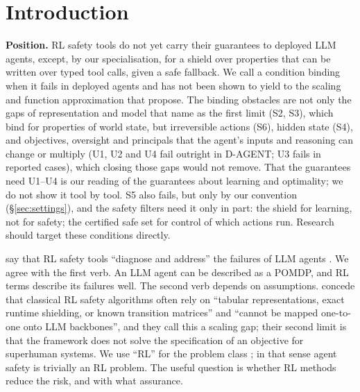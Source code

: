 \documentclass{article}
\begin{document}
\hypertarget{sec:intro}{%
\section{Introduction}\label{sec:intro}}

\textbf{Position.} RL safety tools do not yet carry their guarantees to deployed LLM agents, except, by our specialisation, for a shield over properties that can be written over typed tool calls, given a safe fallback. We call a condition binding when it fails in deployed agents and has not been shown to yield to the scaling and function approximation that \citet{mclean2026} propose. The binding obstacles are not only the gaps of representation and model that \citet[§5]{mclean2026} name as the first limit (S2, S3), which bind for properties of world state, but irreversible actions (S6), hidden state (S4), and objectives, oversight and principals that the agent's inputs and reasoning can change or multiply (U1, U2 and U4 fail outright in D-AGENT; U3 fails in reported cases), which closing those gaps would not remove. That the guarantees need U1--U4 is our reading of the guarantees about learning and optimality; we do not show it tool by tool. S5 also fails, but only by our convention (§\ref{sec:settings}), and the safety filters need it only in part: the shield for learning, not for safety; the certified safe set for control of which actions run. Research should target these conditions directly.

\citet{mclean2026} say that RL safety tools ``diagnose and address'' the failures of LLM agents \citep[Abstract]{mclean2026}. We agree with the first verb. An LLM agent can be described as a POMDP, and RL terms describe its failures well. The second verb depends on assumptions. \citet[§5]{mclean2026} concede that classical RL safety algorithms often rely on ``tabular representations, exact runtime shielding, or known transition matrices'' and ``cannot be mapped one-to-one onto LLM backbones'', and they call this a scaling gap; their second limit is that the framework does not solve the specification of an objective for superhuman systems. We use ``RL'' for the problem class \citep{sutton2018}; in that sense agent safety is trivially an RL problem. The useful question is whether RL methods reduce the risk, and with what assurance.
\end{document}
